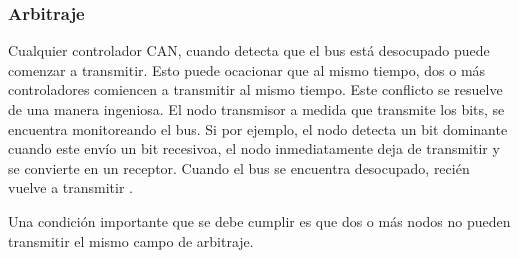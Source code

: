 \subsubsection{Arbitraje}
Cualquier controlador CAN, cuando detecta que el bus está desocupado puede comenzar a transmitir. Esto puede ocacionar que al mismo tiempo, dos o más controladores comiencen a transmitir al mismo tiempo. Este conflicto se resuelve de una manera ingeniosa. El nodo transmisor a medida que transmite los bits, se encuentra monitoreando el bus. Si por ejemplo, el nodo detecta un bit dominante cuando este envío un bit recesivoa, el nodo inmediatamente deja de transmitir y se convierte en un receptor. Cuando el bus se encuentra desocupado, recién vuelve a transmitir \citep{kvaserWEB}.

Una condición importante que se debe cumplir es que dos o más nodos no pueden transmitir el mismo campo de arbitraje.
